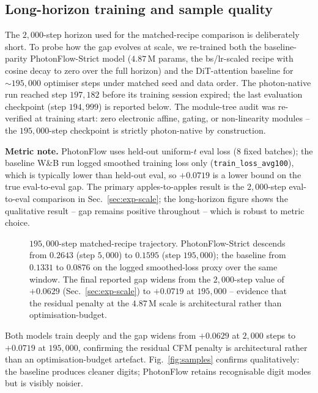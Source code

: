 \documentclass[conference]{IEEEtran}
\begin{document}
\subsection{Long-horizon training and sample quality}
\label{sec:exp-samples}
The $2{,}000$-step horizon used for the matched-recipe comparison
is deliberately short.  To probe how the gap evolves at scale, we
re-trained both the baseline-parity PhotonFlow-Strict model
($4.87$\,M params, the bs/lr-scaled recipe with cosine decay to
zero over the full horizon) and the DiT-attention baseline for
$\sim\!195{,}000$ optimiser steps under matched seed and data
order.  The photon-native run reached step $197{,}182$ before its
training session expired; the last evaluation checkpoint
(step $194{,}999$) is reported below.  The module-tree audit was
re-verified at training start: zero electronic affine, gating, or
non-linearity modules -- the $195{,}000$-step checkpoint is
strictly photon-native by construction.

\textbf{Metric note.}  PhotonFlow uses held-out uniform-$t$ eval
loss (8 fixed batches); the baseline W\&B run logged smoothed
training loss only (\texttt{train\_loss\_avg100}), which is
typically lower than held-out eval, so $+0.0719$ is a lower
bound on the true eval-to-eval gap.  The primary apples-to-apples
result is the $2{,}000$-step eval-to-eval comparison in
Sec.~\ref{sec:exp-scale}; the long-horizon figure shows the
qualitative result -- gap remains positive throughout -- which
is robust to metric choice.

\begin{figure}[tbp]
\centering

\caption{$195{,}000$-step matched-recipe trajectory.
PhotonFlow-Strict descends from $0.2643$ (step $5{,}000$) to
$0.1595$ (step $195{,}000$); the baseline from $0.1331$ to
$0.0876$ on the logged smoothed-loss proxy over the same window.
The final reported gap widens from the
$2{,}000$-step value of $+0.0629$ (Sec.~\ref{sec:exp-scale}) to
$+0.0719$ at $195{,}000$ -- evidence that the residual penalty at
the $4.87$\,M scale is architectural rather than
optimisation-budget.}
\label{fig:traj_long}
\end{figure}

Both models train deeply and the gap widens from $+0.0629$ at
$2{,}000$ steps to $+0.0719$ at $195{,}000$, confirming the
residual CFM penalty is architectural rather than an
optimisation-budget artefact.  Fig.~\ref{fig:samples} confirms
qualitatively: the baseline produces cleaner digits; PhotonFlow
retains recognisable digit modes but is visibly noisier.
\end{document}
